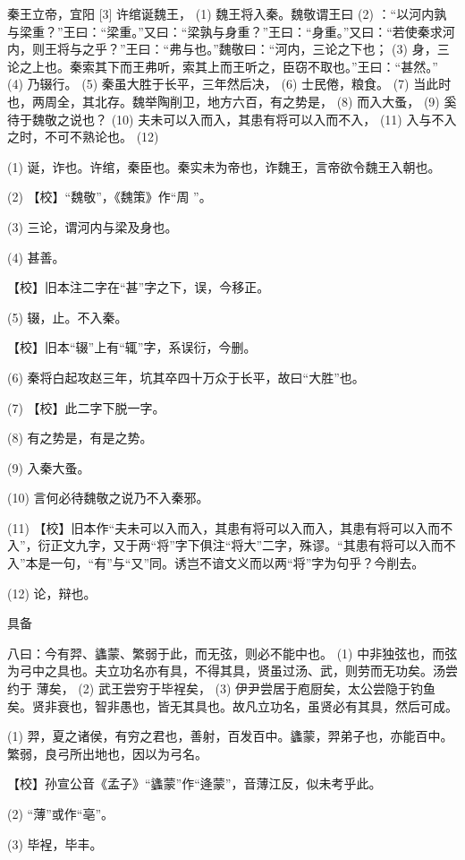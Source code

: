 \documentclass[12pt,UTF8]{ctexbook}
\begin{document}
秦王立帝，宜阳 [3] 许绾诞魏王， (1) 魏王将入秦。魏敬谓王曰 (2) ：“以河内孰与梁重？”王曰：“梁重。”又曰：“梁孰与身重？”王曰：“身重。”又曰：“若使秦求河内，则王将与之乎？”王曰：“弗与也。”魏敬曰：“河内，三论之下也； (3) 身，三论之上也。秦索其下而王弗听，索其上而王听之，臣窃不取也。”王曰：“甚然。” (4) 乃辍行。 (5) 秦虽大胜于长平，三年然后决， (6) 士民倦，粮食。 (7) 当此时也，两周全，其北存。魏举陶削卫，地方六百，有之势是， (8) 而入大蚤， (9) 奚待于魏敬之说也？ (10) 夫未可以入而入，其患有将可以入而不入， (11) 入与不入之时，不可不熟论也。 (12)

(1) 诞，诈也。许绾，秦臣也。秦实未为帝也，诈魏王，言帝欲令魏王入朝也。

(2) 【校】“魏敬”，《魏策》作“周 ”。

(3) 三论，谓河内与梁及身也。

(4) 甚善。

【校】旧本注二字在“甚”字之下，误，今移正。

(5) 辍，止。不入秦。

【校】旧本“辍”上有“辄”字，系误衍，今删。

(6) 秦将白起攻赵三年，坑其卒四十万众于长平，故曰“大胜”也。

(7) 【校】此二字下脱一字。

(8) 有之势是，有是之势。

(9) 入秦大蚤。

(10) 言何必待魏敬之说乃不入秦邪。

(11) 【校】旧本作“夫未可以入而入，其患有将可以入而入，其患有将可以入而不入”，衍正文九字，又于两“将”字下俱注“将大”二字，殊谬。“其患有将可以入而不入”本是一句，“有”与“又”同。诱岂不谙文义而以两“将”字为句乎？今削去。

(12) 论，辩也。





具备


八曰：今有羿、蠭蒙、繁弱于此，而无弦，则必不能中也。 (1) 中非独弦也，而弦为弓中之具也。夫立功名亦有具，不得其具，贤虽过汤、武，则劳而无功矣。汤尝约于 薄矣， (2) 武王尝穷于毕裎矣， (3) 伊尹尝居于庖厨矣，太公尝隐于钓鱼矣。贤非衰也，智非愚也，皆无其具也。故凡立功名，虽贤必有其具，然后可成。

(1) 羿，夏之诸侯，有穷之君也，善射，百发百中。蠭蒙，羿弟子也，亦能百中。繁弱，良弓所出地也，因以为弓名。

【校】孙宣公音《孟子》“蠭蒙”作“逄蒙”，音薄江反，似未考乎此。

(2) “薄”或作“亳”。

(3) 毕裎，毕丰。
\end{document}
